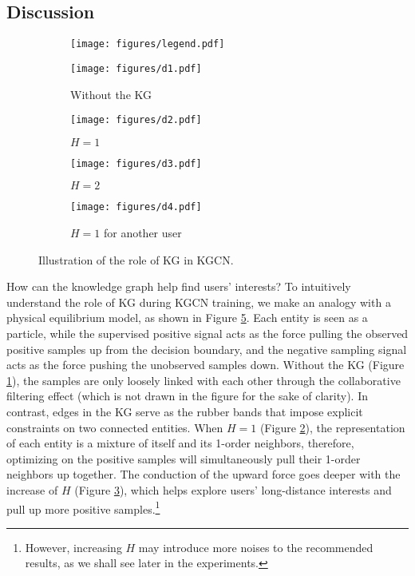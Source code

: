 \documentclass[sigconf]{acmart}
\begin{document}
	\subsection{Discussion}
	\label{sec:discussion}
		\begin{figure}
			\centering
			\begin{subfigure}[b]{0.48\textwidth}
   				\texttt{[image: figures/legend.pdf]}
			\end{subfigure}
			\hfill
			\begin{subfigure}[b]{0.21\textwidth}
   				\texttt{[image: figures/d1.pdf]}
   				\caption{Without the KG}
   				\label{fig:d1}
			\end{subfigure}
			\hfill
			\begin{subfigure}[b]{0.21\textwidth}
				\texttt{[image: figures/d2.pdf]}
				\caption{$H = 1$}
				\label{fig:d2}
			\end{subfigure}
			\hfill
			\begin{subfigure}[b]{0.21\textwidth}
   				\texttt{[image: figures/d3.pdf]}
   				\caption{$H = 2$}
   				\label{fig:d3}
			\end{subfigure}
			\hfill
			\begin{subfigure}[b]{0.21\textwidth}
				\texttt{[image: figures/d4.pdf]}
				\caption{$H = 1$ for another user}
				\label{fig:d4}
			\end{subfigure}
			\caption{Illustration of the role of KG in KGCN.}			
			\label{fig:discussion}
		\end{figure}	
	
		How can the knowledge graph help find users' interests?
		To intuitively understand the role of KG during KGCN training, we make an analogy with a physical equilibrium model, as shown in Figure \ref{fig:discussion}.
		Each entity is seen as a particle, while the supervised positive signal acts as the force pulling the observed positive samples up from the decision boundary, and the negative sampling signal acts as the force pushing the unobserved samples down.
		Without the KG (Figure \ref{fig:d1}), the samples are only loosely linked with each other through the collaborative filtering effect (which is not drawn in the figure for the sake of clarity).
		In contrast, edges in the KG serve as the rubber bands that impose explicit constraints on two connected entities.
		When $H=1$ (Figure \ref{fig:d2}), the representation of each entity is a mixture of itself and its 1-order neighbors, therefore, optimizing on the positive samples will simultaneously pull their 1-order neighbors up together.
		The conduction of the upward force goes deeper with the increase of $H$ (Figure \ref{fig:d3}), which helps explore users' long-distance interests and pull up more positive samples.\footnote{However, increasing $H$ may introduce more noises to the recommended results, as we shall see later in the experiments.}
		
\end{document}
